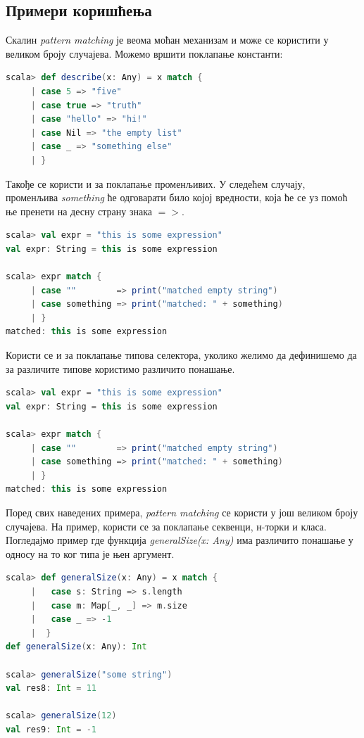 \documentclass[12pt,oneside]{memoir}
\begin{document}
\subsection{Примери коришћења}
\label{subsec:scala_match_exaples}

Скалин \textit{pattern matching} је веома моћан механизам и може се користити у великом броју случајева. Можемо вршити поклапање константи:

\begin{lstlisting}[language=Scala]
scala> def describe(x: Any) = x match {
     | case 5 => "five"
     | case true => "truth"
     | case "hello" => "hi!"
     | case Nil => "the empty list"
     | case _ => "something else"
     | }
\end{lstlisting}

Такође се користи и за поклапање променљивих. У следећем случају, променљива \textit{something} ће одговарати било којој вредности, која ће се уз помоћ ње пренети на десну страну знака $=>$. \cite{scala_prog}

\begin{lstlisting}[language=Scala]
scala> val expr = "this is some expression"
val expr: String = this is some expression

scala> expr match {
     | case ""        => print("matched empty string")
     | case something => print("matched: " + something)
     | }
matched: this is some expression
\end{lstlisting}

Користи се и за поклапање типова селектора, уколико желимо да дефинишемо да за различите типове користимо различито понашање.

\begin{lstlisting}[language=Scala]
scala> val expr = "this is some expression"
val expr: String = this is some expression

scala> expr match {
     | case ""        => print("matched empty string")
     | case something => print("matched: " + something)
     | }
matched: this is some expression
\end{lstlisting}

Поред свих наведених примера, \textit{pattern matching} се користи у још великом броју случајева. На пример, користи се за поклапање секвенци, н-торки и класа. Погледајмо пример где функција \textit{generalSize(x: Any)} има различито понашање у односу на то ког типа је њен аргумент. \cite{scala_prog}

\begin{lstlisting}[language=Scala]
scala> def generalSize(x: Any) = x match {
     |   case s: String => s.length
     |   case m: Map[_, _] => m.size
     |   case _ => -1
     |  }
def generalSize(x: Any): Int

scala> generalSize("some string")
val res8: Int = 11

scala> generalSize(12)
val res9: Int = -1
\end{lstlisting}
\end{document}
